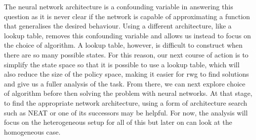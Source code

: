 \documentclass[12pt]{article}
\begin{document}
The neural network architecture is a confounding variable in answering this question as it is never clear if the network is capable of approximating a function that generalises the desired behaviour.
Using a different architecture, like a lookup table, removes this confounding variable and allows us instead to focus on the choice of algorithm.
A lookup table, however, is difficult to construct when there are so many possible states.
For this reason, our next course of action is to simplify the state space so that it is possible to use a lookup table, which will also reduce the size of the policy space, making it easier for rwg to find solutions and give us a fuller analysis of the task.
From there, we can next explore choice of algorithm before then solving the problem with neural networks.
At that stage, to find the appropriate network architecture, using a form of architecture search such as NEAT \cite{stanley:MIT:2002} or one of its successors may be helpful.
For now, the analysis will focus on the heterogeneous setup for all of this but later on can look at the homogeneous case.



\end{document}
